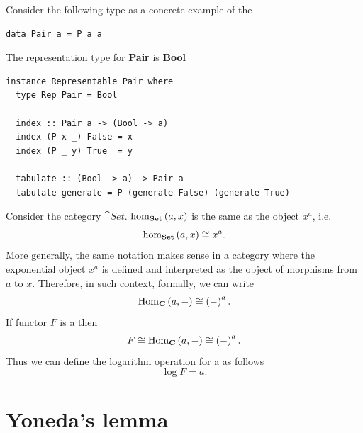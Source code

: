 \begin{example}
Consider the following type as a concrete example of the
\begin{verbatim}
data Pair a = P a a
\end{verbatim} 
The representation type for \textbf{Pair} is \textbf{Bool}
\begin{verbatim}
instance Representable Pair where
  type Rep Pair = Bool

  index :: Pair a -> (Bool -> a)
  index (P x _) False = x
  index (P _ y) True  = y

  tabulate :: (Bool -> a) -> Pair a
  tabulate generate = P (generate False) (generate True)
\end{verbatim} 

\end{example}

\begin{remark}
Consider the category $\cat{Set}$. 
$\catmset[Set]{a}{x}$ is the same as the 
object $x^a$, i.e.
\[
\catmset[Set]{a}{x} \cong x^a.
\]
More generally, the same notation makes sense in a category where the
exponential object $x^a$ is defined and interpreted as the object of
morphisms from $a$ to $x$. Therefore, in such context, formally, we can write
\[
\mathrm{Hom}_{\mathbf{C}}\left(a, -\right) \cong \left(-\right)^a.
\]
If functor $F$ is a  then
\[
F \cong \mathrm{Hom}_{\mathbf{C}}\left(a, -\right) \cong \left(-\right)^a.
\]
Thus we can define the logarithm operation for a
 as follows
\[
\log F = a.
\]
\end{remark}

\section{Yoneda's lemma}

